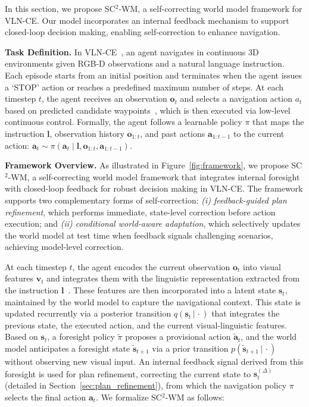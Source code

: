 \documentclass{article}
\theoremstyle{plain}
\theoremstyle{definition}
\theoremstyle{remark}
\begin{document}
In this section, we propose SC$^{2}$-WM, a self-correcting world model framework for VLN-CE.
Our model incorporates an internal feedback mechanism to support closed-loop decision making, enabling self-correction to enhance navigation.


\noindent\textbf{Task Definition.}
In VLN-CE~\cite{krantz2020beyond,Krantz2022Sim2SimTF,wang2024sim}, an agent navigates in continuous 3D environments given RGB-D observations and a natural language instruction. Each episode starts from an initial position and terminates when the agent issues a {`STOP'} action or reaches a predefined maximum number of steps.
At each timestep $t$, the agent receives an observation $\boldsymbol{o}_{t}$ and selects a navigation action $a_t$ based on predicted candidate waypoints~\cite{krantz2021waypoint,Hong2022BridgingTG}, which is then executed via low-level continuous control.
Formally, the agent follows a learnable policy $\pi$ that maps the instruction $\boldsymbol{l}$, observation history $\boldsymbol{o}_{1:t}$, and past actions $\boldsymbol{a}_{1:t-1}$ to the current action:
$\boldsymbol{a}_t \sim \pi(\boldsymbol{a}_t \mid \boldsymbol{l}, \boldsymbol{o}_{1:t}, \boldsymbol{a}_{1:t-1})$.



\noindent\textbf{Framework Overview.}
As illustrated in Figure~\ref{fig:framework}, we propose SC$^{2}$-WM, a self-correcting world model framework that integrates internal foresight with closed-loop feedback for robust decision making in VLN-CE.
The framework supports two complementary forms of self-correction:
\emph{(i) feedback-guided plan refinement}, which performs immediate, state-level correction before action execution; and
\emph{(ii) conditional world-aware adaptation}, which selectively updates the world model at test time when feedback signals challenging scenarios, achieving model-level correction.


At each timestep $t$, the agent encodes the current observation $\boldsymbol{o}_t$ into visual features $\boldsymbol{v}_t$ and integrates them with the linguistic representation extracted from the instruction $\boldsymbol{l}$~\cite{chen2022think,an2024etpnav}.
These features are then incorporated into a latent state $\boldsymbol{s}_t$, maintained by the world model to capture the navigational context.
This state is updated recurrently via a posterior transition $q({\boldsymbol{s}}_{t}\,|\, \cdot)$ that integrates the previous state, the executed action, and the current visual-linguistic features.
Based on $\boldsymbol{s}_t$, a foresight policy $\tilde{\pi}$ proposes a provisional action $\tilde{\boldsymbol{a}}_t$, and the world model anticipates a foresight state $\tilde{\boldsymbol{s}}_{t+1}$ via a prior transition $p(\tilde{\boldsymbol{s}}_{t+1}\,|\, \cdot)$ without observing new visual input.
An internal feedback signal derived from this foresight is used for {plan refinement}, correcting the current state to $\boldsymbol{s}_t^{(\Delta)}$ (detailed in Section~\ref{sec:plan_refinement}), from which the navigation policy $\pi$ selects the final action $\boldsymbol{a}_t$.
We formalize SC$^{2}$-WM as follows:
\end{document}
